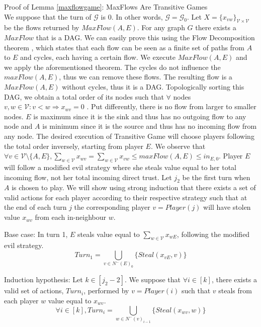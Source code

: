 \begin{sepproof}{Proof of Lemma \ref{maxflowgame}: MaxFlows Are Transitive Games} \ \\
\label{maxflowgameproof}
   We suppose that the turn of $\mathcal{G}$ is 0. In other words, $\mathcal{G} = \mathcal{G}_0$. Let
   $X = \{x_{vw}\}_{\mathcal{V} \times \mathcal{V}}$ be the flows returned by $MaxFlow\left(A, E\right)$. For any graph
   $G$ there exists a $MaxFlow$ that is a DAG. We can easily prove this using the Flow Decomposition theorem
   \cite{amo}, which states that each flow can be seen as a finite set of paths from $A$ to $E$ and cycles, each
   having a certain flow. We execute $MaxFlow\left(A, E\right)$ and we apply the aforementioned theorem. The
   cycles do not influence the $maxFlow\left(A, E\right)$, thus we can remove these flows. The resulting flow is a
   $MaxFlow\left(A, E\right)$ without cycles, thus it is a DAG. Topologically sorting this DAG, we obtain a total order
   of its nodes such that $\forall$ nodes $v, w \in \mathcal{V} : v < w \Rightarrow x_{wv} = 0$ \cite{clrs}. Put
   differently, there is no flow from larger to smaller nodes. $E$ is maximum since it is the sink and thus has no
   outgoing flow to any node and $A$ is minimum since it is the source and thus has no incoming flow from any node. The
   desired execution of Transitive Game will choose players following the total order inversely, starting from player
   $E$. We observe that $\forall v \in \mathcal{V} \setminus \{A, E\}, \sum\limits_{w \in \mathcal{V}}x_{wv} =
   \sum\limits_{w \in \mathcal{V}}x_{vw} \leq maxFlow\left(A, E\right) \leq in_{E, 0}$. Player $E$ will follow a modified
   evil strategy where she steals value equal to her total incoming flow, not her total incoming direct trust. Let $j_2$ be
   the first turn when $A$ is chosen to play. We will show using strong induction that there exists a set of valid actions
   for each player according to their respective strategy such that at the end of each turn $j$ the corresponding player
   $v = Player\left(j\right)$ will have stolen value $x_{wv}$ from each in-neighbour $w$.

   Base case: In turn 1, $E$ steals value equal to $\sum\limits_{w \in \mathcal{V}}x_{wE}$, following the modified evil
   strategy.
   \begin{equation*}
      Turn_1 = \bigcup\limits_{v \in N^{-}\left(E\right)_0}\{Steal\left(x_{vE}, v\right)\}
   \end{equation*}

   Induction hypothesis: Let $k \in [j_2 - 2]$. We suppose that $\forall i \in [k]$, there exists a valid set of actions,
   $Turn_i$, performed by $v = Player\left(i\right)$ such that $v$ steals from each player $w$ value equal to $x_{wv}$.
   \begin{equation*}
      \forall i \in [k], Turn_i = \bigcup\limits_{w \in N^{-}\left(v\right)_{i-1}}\{Steal\left(x_{wv}, w\right)\}
   \end{equation*}


\end{sepproof}
